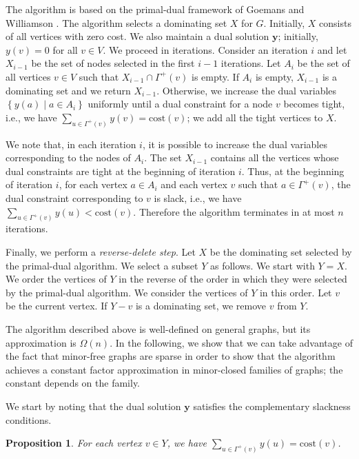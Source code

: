\documentclass[11pt]{article}
\newtheorem{prop}[lemma]{Proposition}
\def\set#1{\left\{#1\right\}}
\def\sep{\;|\;}
\def\cost{\mathrm{cost}}
\def\vy{\mathrm{\mathbf{y}}}
\begin{document}
\noindent
The algorithm is based on the primal-dual framework of Goemans and
Williamson \cite{GoemansW95}. The algorithm selects a dominating set
$X$ for $G$. Initially, $X$ consists of all vertices with zero cost.
We also maintain a dual solution $\vy$; initially, $y(v) = 0$ for all
$v \in V$. We proceed in iterations. Consider an iteration $i$ and
let $X_{i - 1}$ be the set of nodes selected in the first $i - 1$
iterations.  Let $A_i$ be the set of all vertices $v \in V$ such that
$X_{i - 1} \cap \Gamma^+(v)$ is empty. If $A_i$ is empty, $X_{i - 1}$
is a dominating set and we return $X_{i - 1}$.  Otherwise, we
increase the dual variables $\set{y(a) \sep a \in A_i}$ uniformly
until a dual constraint for a node $v$ becomes tight, i.e., we have
$\sum_{u \in \Gamma^+(v)} y(v) = \cost(v)$; we add all the tight
vertices to $X$.

We note that, in each iteration $i$, it is possible to increase the
dual variables corresponding to the nodes of $A_i$. The set $X_{i -
1}$ contains all the vertices whose dual constraints are tight at the
beginning of iteration $i$. Thus, at the beginning of iteration $i$,
for each vertex $a \in A_i$ and each vertex $v$ such that $a \in
\Gamma^+(v)$, the dual constraint corresponding to $v$ is slack,
i.e., we have $\sum_{u \in \Gamma^+(v)} y(u) < \cost(v)$. Therefore
the algorithm terminates in at most $n$ iterations.

Finally, we perform a \emph{reverse-delete step}. Let $X$ be the
dominating set selected by the primal-dual algorithm. We select a
subset $Y$ as follows. We start with $Y = X$. We order the vertices
of $Y$ in the reverse of the order in which they were selected by the
primal-dual algorithm. We consider the vertices of $Y$ in this order.
Let $v$ be the current vertex. If $Y - v$ is a dominating set, we
remove $v$ from $Y$.

The algorithm described above is well-defined on general graphs, but
its approximation is $\Omega(n)$. In the following, we show that we
can take advantage of the fact that minor-free graphs are sparse in
order to show that the algorithm achieves a constant factor
approximation in minor-closed families of graphs; the constant
depends on the family.

We start by noting that the dual solution $\vy$ satisfies the
complementary slackness conditions.

\begin{prop} \label{prop:complementary-slackness}
	For each vertex $v \in Y$, we have $\sum_{u \in \Gamma^+(v)}
	y(u) = \cost(v)$.
\end{prop}
\end{document}
